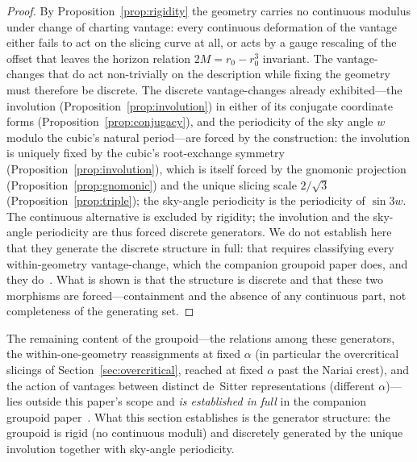 \documentclass[11pt,a4paper]{article}
\theoremstyle{definition}
\begin{document}
\begin{proof}
By Proposition~\ref{prop:rigidity} the geometry carries no continuous modulus under change of charting vantage: every continuous deformation of the vantage either fails to act on the slicing curve at all, or acts by a gauge rescaling of the offset that leaves the horizon relation $2M=r_{0}-r_{0}^{3}$ invariant. The vantage-changes that do act non-trivially on the description while fixing the geometry must therefore be discrete. The discrete vantage-changes already exhibited---the involution (Proposition~\ref{prop:involution}) in either of its conjugate coordinate forms (Proposition~\ref{prop:conjugacy}), and the periodicity of the sky angle $w$ modulo the cubic's natural period---are forced by the construction: the involution is uniquely fixed by the cubic's root-exchange symmetry (Proposition~\ref{prop:involution}), which is itself forced by the gnomonic projection (Proposition~\ref{prop:gnomonic}) and the unique slicing scale $2/\sqrt3$ (Proposition~\ref{prop:triple}); the sky-angle periodicity is the periodicity of $\sin 3w$. The continuous alternative is excluded by rigidity; the involution and the sky-angle periodicity are thus forced discrete generators. We do not establish here that they generate the discrete structure in full: that requires classifying every within-geometry vantage-change, which the companion groupoid paper does, and they do~\cite{JanzenGroupoid}. What is shown is that the structure is discrete and that these two morphisms are forced---containment and the absence of any continuous part, not completeness of the generating set.
\end{proof}

The remaining content of the groupoid---the relations among these generators, the within-one-geometry reassignments at fixed $\alpha$ (in particular the overcritical slicings of Section~\ref{sec:overcritical}, reached at fixed $\alpha$ past the Nariai crest), and the action of vantages between distinct de~Sitter representations (different $\alpha$)---lies outside this paper's scope and \emph{is established in full} in the companion groupoid paper~\cite{JanzenGroupoid}. What this section establishes is the generator structure: the groupoid is rigid (no continuous moduli) and discretely generated by the unique involution together with sky-angle periodicity.
\end{document}
